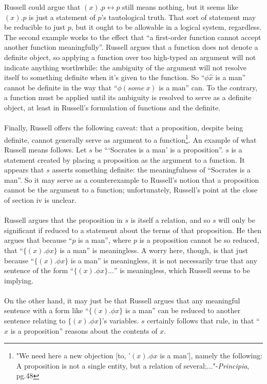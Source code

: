 \documentclass{article}
\begin{document}
Russell could argue that $(x).p\leftrightarrow p$ still means nothing, but it seems like $(x).p$ is just a statement of $p$'s tautological truth. That sort of statement may be reducible to just $p$, but it ought to be allowable in a logical system, regardless.
The second example works to the effect that “a first-order function cannot accept another function meaningfully”. 
Russell argues that a function does not denote a definite object, so applying a function over too high-typed an argument will not indicate anything worthwhile: the ambiguity of the argument will not resolve itself to something definite when it's given to the function.
So “$\phi\hat x$ is a man” cannot be definite in the way that “$\phi(some\ x)$ is a man” can. To the contrary, a function must be applied until its ambiguity is resolved to serve as a definite object, at least in Russell’s formulation of functions and the definite.
\paragraph{}
Finally, Russell offers the following caveat: that a proposition, despite being definite, cannot generally serve as argument to a function\footnote[10]{"We need here a new objection [to, '$(x).\phi x$ is a man'], namely the following: A proposition is not a single entity, but a relation of several;..."-\textit{Principia}, pg.48}.
An example of what Russell means follows. Let $s$ be “‘Socrates is a man’ is a proposition”. $s$ is a statement created by placing a proposition as the argument to a function. It appears that $s$ asserts something definite: the meaningfulness of “Socrates is a man”. So it may serve as a counterexample to Russell’s notion that a proposition cannot be the argument to a function; unfortunately, Russell's point at the close of section iv is unclear.
\paragraph{}
Russell argues that the proposition in $s$ is itself a relation, and so $s$ will only be significant if reduced to a statement about the terms of that proposition. He then argues that because “$p$ is a man”, where $p$ is a proposition cannot be so reduced, that “$\{(x).\phi x\}$ is a man” is meaningless. 
A worry here, though, is that just because “$\{(x).\phi x\}$ is a man” is meaningless, it is not necessarily true that any sentence of the form “$\{(x).\phi x\} ...$” is meaningless, which Russell seems to be implying.
\paragraph{}
On the other hand, it may just be that Russell argues that any meaningful sentence with a form like “$\{(x).\phi x\}$ is a man” can be reduced to another sentence relating to $\{(x).\phi x\}$’s variables. $s$ certainly follows that rule, in that “$x$ is a proposition” reasons about the contents of $x$.
\end{document}
